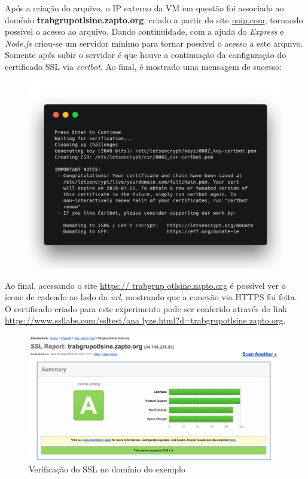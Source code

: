 \documentclass[
    openany,
    12pt,               %
    twoside,            %
    a4paper,            %
    english,            %
    brazil,             %
    ]{abntex2}
\begin{document}
Após a criação do arquivo, o IP externo da VM em questão foi associado ao domínio \textbf{trabgrupotlsine.zapto.org}, criado a partir do site \href{https://noip.com}{noip.com}, tornando possível o acesso ao arquivo. Dando continuidade, com a ajuda do \textit{Express} e \textit{Node.js} criou-se um servidor mínimo para tornar possível o acesso a este arquivo. Somente após subir o servidor é que houve a continuação da configuração do certificado SSL via \textit{certbot}. Ao final, é mostrado uma mensagem de sucesso:

\begin{figure}[H]
\centering
\includegraphics[width=13.5cm]{created.png}
\end{figure}

Ao final, acessando o site \href{https://trabgrupotlsine.zapto.org}{https:// trabgrup otlsine.zapto.org} é possível ver o ícone de cadeado ao lado da \textit{url}, mostrando que a conexão via HTTPS foi feita. O certificado criado para este experimento pode ser conferido através do link \href{https://www.ssllabs.com/ssltest/analyze.html?d=trabgrupotlsine.zapto.org}{https://www.ssllabs.com/ssltest/ana lyze.html?d=trabgrupotlsine.zapto.org}.

\begin{figure}[H]
\centering
\includegraphics[width=1.1\textwidth]{ssl_verification.png}
\caption{Verificação do SSL no domínio do exemplo}
\end{figure}
\end{document}
